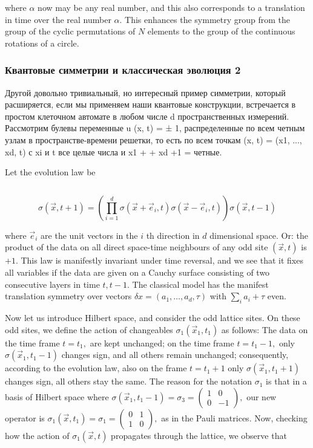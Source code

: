 \documentclass[main.tex]{subfiles}
\begin{document}
where $\alpha$ now may be any real number, and this also corresponds to a translation in time over the real number $\alpha .$ This enhances the symmetry group from the group of the cyclic permutations of $N$ elements to the group of the continuous rotations of a circle.

\subsubsection{Квантовые симметрии и классическая эволюция 2}\label{ch18.2.6}

Другой довольно тривиальный, но интересный пример симметрии, который расширяется, если мы применяем наши квантовые конструкции, встречается в простом клеточном автомате в любом числе d пространственных измерений. Рассмотрим булевы переменные u (x, t) = ± 1, распределенные по всем четным узлам в пространстве-времени решетки, то есть по всем точкам (x, t) = (x1, ..., xd, t) с xi и t все целые числа и x1 + + xd +1 = четные.

Let the evolution law be

\begin{equation}\label{}
	
\end{equation}

$$
\sigma(\vec{x}, t+1)=\left(\prod_{i=1}^{d} \sigma\left(\vec{x}+\vec{e}_{i}, t\right) \sigma\left(\vec{x}-\vec{e}_{i}, t\right)\right) \sigma(\vec{x}, t-1)
$$

where $\vec{e}_{i}$ are the unit vectors in the $i$ th direction in $d$ dimensional space. Or: the product of the data on all direct space-time neighbours of any odd site $(\vec{x}, t)$ is
$+1 .$ This law is manifestly invariant under time reversal, and we see that it fixes all variables if the data are given on a Cauchy surface consisting of two consecutive layers in time $t, t-1 .$ The classical model has the manifest translation symmetry over vectors $\delta x=\left(a_{1}, \ldots, a_{d}, \tau\right)$ with $\sum_{i} a_{i}+\tau$ even.

Now let us introduce Hilbert space, and consider the odd lattice sites. On these odd sites, we define the action of changeables $\sigma_{1}\left(\vec{x}_{1}, t_{1}\right)$ as follows:
The data on the time frame $t=t_{1},$ are kept unchanged; on the time frame $t=t_{1}-1,$ only $\sigma\left(\vec{x}_{1}, t_{1}-1\right)$ changes sign, and all others remain unchanged; consequently, according to the evolution law, also on the frame $t=t_{1}+1$ only $\sigma\left(\vec{x}_{1}, t_{1}+1\right)$ changes sign, all others stay the same.
The reason for the notation $\sigma_{1}$ is that in a basis of Hilbert space where $\sigma\left(\vec{x}_{1}, t_{1}-1\right)=\sigma_{3}=\left(\begin{array}{c}{ 1}&{0} \\ {0} & {-1}\end{array}\right),$ our new operator is $\sigma_{1}\left(\vec{x}, t_{1}\right)=\sigma_{1}=\left(\begin{array}{cc}{0} & {1} \\ {1} & {0}\end{array}\right),$ as in
the Pauli matrices. Now, checking how the action of $\sigma_{1}(\vec{x}, t)$ propagates through the lattice, we observe that
\end{document}
